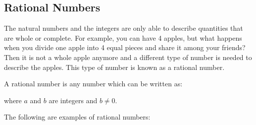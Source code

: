             \subsection{ Rational Numbers}
            \nopagebreak
        \label{m38346*id178622}The natural numbers and the integers are only able to describe quantities that
are whole or complete. For example, you can have 4 apples, but what happens when
you divide one apple into 4 equal pieces and share it among your friends? Then
it is not a whole apple anymore and a different type of number is needed to
describe the apples. This type of number is known as a rational number.\par 
        \label{m38346*id178628}A rational number is any number which can be written as:\par 
        \label{m38346*uid59}\nopagebreak\noindent{}
        \label{m38346*id178652}where $a$ and $b$ are integers and $b\ne 0$.\par 
        \label{m38346*id178690}The following are examples of rational numbers:\par 
        \label{m38346*uid60}\nopagebreak\noindent{}
